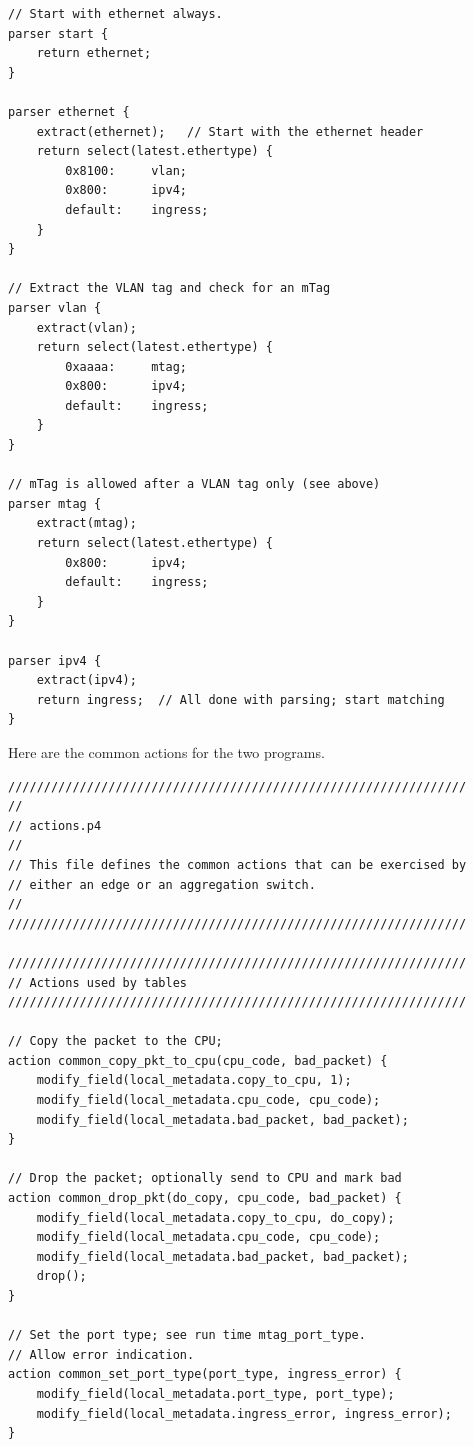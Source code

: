 \documentclass[12pt]{article}
\begin{document}
\begin{itemize}
\begin{lstlisting}[keywords={},frame=single,escapechar=\@]
// Start with ethernet always.
parser start {
    return ethernet;    
}

parser ethernet {
    extract(ethernet);   // Start with the ethernet header
    return select(latest.ethertype) {
        0x8100:     vlan;
        0x800:      ipv4;
        default:    ingress;
    }
}

// Extract the VLAN tag and check for an mTag
parser vlan {
    extract(vlan);
    return select(latest.ethertype) {
        0xaaaa:     mtag;
        0x800:      ipv4;
        default:    ingress;
    }
}

// mTag is allowed after a VLAN tag only (see above)
parser mtag {
    extract(mtag);
    return select(latest.ethertype) {
        0x800:      ipv4;
        default:    ingress;
    }
}

parser ipv4 {
    extract(ipv4);
    return ingress;  // All done with parsing; start matching
}
\end{lstlisting}

Here are the common actions for the two programs.

\begin{lstlisting}[keywords={},frame=single,escapechar=\@]
////////////////////////////////////////////////////////////////
//
// actions.p4
//
// This file defines the common actions that can be exercised by
// either an edge or an aggregation switch. 
//
////////////////////////////////////////////////////////////////

////////////////////////////////////////////////////////////////
// Actions used by tables
////////////////////////////////////////////////////////////////

// Copy the packet to the CPU;
action common_copy_pkt_to_cpu(cpu_code, bad_packet) {
    modify_field(local_metadata.copy_to_cpu, 1);
    modify_field(local_metadata.cpu_code, cpu_code);
    modify_field(local_metadata.bad_packet, bad_packet);
}

// Drop the packet; optionally send to CPU and mark bad
action common_drop_pkt(do_copy, cpu_code, bad_packet) {
    modify_field(local_metadata.copy_to_cpu, do_copy);
    modify_field(local_metadata.cpu_code, cpu_code);
    modify_field(local_metadata.bad_packet, bad_packet);
    drop();
}

// Set the port type; see run time mtag_port_type. 
// Allow error indication.
action common_set_port_type(port_type, ingress_error) {
    modify_field(local_metadata.port_type, port_type);
    modify_field(local_metadata.ingress_error, ingress_error);
}
\end{lstlisting}


\end{itemize}
\end{document}
